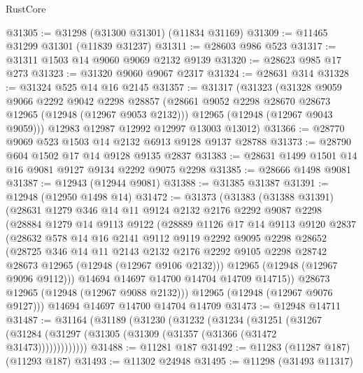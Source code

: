 \begin{lexlean}{RustCore}
\begin{coremodule}
@31305 := @31298 (@31300 @31301) (@11834 @31169)
@31309 := @11465 @31299 @31301 (@11839 @31237)
@31311 := @28603 @986 @523
@31317 := @31311 @1503 @14 @9060 @9069 @2132 @9139
@31320 := @28623 @985 @17 @273
@31323 := @31320 @9060 @9067 @2317
@31324 := @28631 @314
@31328 := @31324 @525 @14 @16 @2145
@31357 := @31317
    (@31323
      (@31328
        @9059
        @9066
        @2292
        @9042
        @2298
        @28857
        (@28661 @9052 @2298 @28670 @28673 @12965 (@12948 (@12967 @9053 @2132)))
        @12965
        (@12948 (@12967 @9043 @9059)))
      @12983
      @12987
      @12992
      @12997
      @13003
      @13012)
@31366 := @28770 @9069 @523 @1503 @14 @2132 @6913 @9128 @9137 @28788
@31373 := @28790 @604 @1502 @17 @14 @9128 @9135 @2837
@31383 := @28631 @1499 @1501 @14 @16 @9081 @9127 @9134 @2292 @9075 @2298
@31385 := @28666 @1498 @9081
@31387 := @12943 (@12944 @9081)
@31388 := @31385 @31387
@31391 := @12948 (@12950 @1498 @14)
@31472 := @31373
    (@31383
      (@31388 @31391)
      (@28631
        @1279
        @346
        @14
        @11
        @9124
        @2132
        @2176
        @2292
        @9087
        @2298
        (@28884
          @1279
          @14
          @9113
          @9122
          (@28889
            @1126
            @17
            @14
            @9113
            @9120
            @2837
            (@28632
              @578
              @14
              @16
              @2141
              @9112
              @9119
              @2292
              @9095
              @2298
              @28652
              (@28725
                @346
                @14
                @11
                @2143
                @2132
                @2176
                @2292
                @9105
                @2298
                @28742
                @28673
                @12965
                (@12948 (@12967 @9106 @2132)))
              @12965
              (@12948 (@12967 @9096 @9112)))
            @14694
            @14697
            @14700
            @14704
            @14709
            @14715))
        @28673
        @12965
        (@12948 (@12967 @9088 @2132)))
      @12965
      (@12948 (@12967 @9076 @9127)))
    @14694
    @14697
    @14700
    @14704
    @14709
@31473 := @12948 @14711
@31487 := @31164
    (@31189
      (@31230
        (@31232
          (@31234
            (@31251
              (@31267 (@31284 (@31297 (@31305 (@31309 (@31357 (@31366 (@31472 @31473)))))))))))))
@31488 := @11281 @187
@31492 := @11283 (@11287 @187) (@11293 @187)
@31493 := @11302 @24948
@31495 := @11298 (@31493 @11317)

\end{coremodule}
\end{lexlean}
